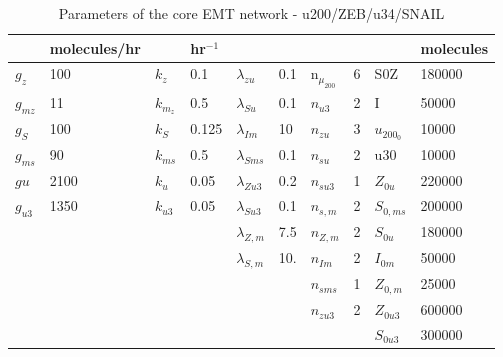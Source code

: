 \documentclass{article}
\begin{document}
\begin{table}[ht]
\begin{tabular}{ll|ll|ll|ll|ll}
                & molecules/hr  &               & hr$^{-1}$    &                       &               &                       &               &                       & molecules     \\
\hline
$g_z$           & 100           & $k_z$         & 0.1           & $\lambda_{zu}$        & 0.1           & n$_{\mu_{200}}$       & 6             & S0Z                   & 180000        \\
$g_{mz}$        & 11            & $k_{m_{z}}$   & 0.5           & $\lambda_{Su}$        & 0.1           & $n_{u3}$              & 2             & I                     & 50000         \\
$g_S$           & 100           & $k_S$         & 0.125         & $\lambda_{Im}$        & 10            & $n_{zu}$              & 3             & $u_{200_{0}}$         & 10000         \\
$g_{ms}$        & 90            & $k_{ms}$      & 0.5           & $\lambda_{Sms}$       & 0.1           & $n_{su}$              & 2             & u30                   & 10000         \\
$gu$            & 2100          & $k_u$         & 0.05          & $\lambda_{Zu3}$       & 0.2           & $n_{su3}$             & 1             & $Z_{0u}$              & 220000        \\
$ g_{u3}$       & 1350          & $k_{u3}$      & 0.05          & $\lambda_{Su3}$       & 0.1           & $n_{s,m}$             & 2             & $S_{0,ms}$            & 200000        \\
                &               &               &               & $\lambda_{Z,m}$       & 7.5           & $n_{Z,m}$             & 2             & $S_{0u}$              & 180000        \\
                &               &               &               & $\lambda_{S,m}$       & 10.           & $n_{Im}$              & 2             & $I_{0m}$              & 50000         \\
                &               &               &               &                       &               & $n_{sms}$             & 1             & $Z_{0,m}$             & 25000         \\
                &               &               &               &                       &               & $n_{zu3}$             & 2             & $Z_{0u3}$             & 600000        \\
                &               &               &               &                       &               &                       &               & $S_{0u3}$             & 300000        \\
\end{tabular}
\caption{Parameters of the core EMT network  -  u200/ZEB/u34/SNAIL}
\label{table:eparams}
\end{table}
\end{document}
